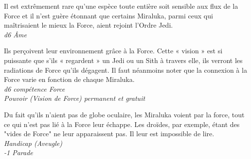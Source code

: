 \begin{description}[align=left]
\item [Sensibilité raciale à la force] 	%
		Il est extrêmement rare qu’une espèce toute entière soit sensible aux flux de la Force et il n’est guère étonnant que certains Miraluka, parmi ceux qui maîtrisaient le mieux la Force, aient rejoint l’Ordre Jedi.\\
		\textit{d6 \^Ame}

\item [Vision de force] 			%
		Ils perçoivent leur environnement grâce à la Force. Cette « vision » est si puissante que s’ils « regardent » un Jedi ou un Sith à travers elle, ils verront les radiations de Force qu’ils dégagent. Il faut néanmoins noter que la connexion à la Force varie en fonction de chaque Miraluka.\\
		\textit{d6 compétence Force}\\
		\textit{Pouvoir (Vision de Force) permanent et gratuit}

\item [Aveugle dans la lumière] 	%
		Du fait qu’ils n’aient pas de globe oculaire, les Miraluka voient par la force, tout ce qui n’est pas lié à la Force leur échappe. Les droïdes, par exemple, étant des "vides de Force" ne leur apparaissent pas. Il leur est impossible de lire.\\
		\textit{Handicap (Aveugle)}\\
		\textit{-1 Parade}
\end{description}